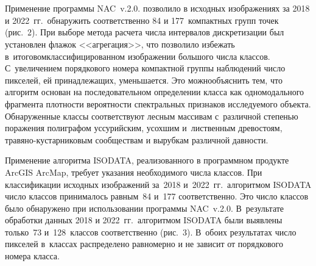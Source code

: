 \begin{multicols}{2}
\begin{figure*} %
 \vspace*{1pt}
\begin{center}
   \mbox{%
\epsfxsize=163mm 
}
\end{center}
\vspace*{-9pt}
 \vspace*{7pt}
\begin{center}
   \mbox{%
\epsfxsize=163mm 
}
\end{center}
\vspace*{-9pt}
\end{figure*}
  
  Применение программы NAC~v.2.0. позволило в исходных изображениях за 
2018 и 2022~гг.\ обнаружить соответственно 84 и 177~компактных групп точек 
(рис.~2). При выборе метода расчета чис\-ла интервалов 
дискретизации был установлен флажок <<агрегация>>, что позволило избежать 
в~итоговом\linebreak классифицированном изображении большого чис\-ла классов. 
С~увеличением порядкового номера компактной группы наблюдений чис\-ло 
пикселей, ей при\-над\-ле\-жа\-щих, уменьшается. Это можно\linebreak объяснить тем, что 
алгоритм основан на по\-сле\-до\-ва\-тель\-ном опре\-де\-ле\-нии класса как 
одномодального фрагмента плот\-ности ве\-ро\-ятн\-ости спект\-раль\-ных 
признаков исследуемого объекта. \mbox{Обнаруженные} классы соответствуют лес\-ным 
массивам с~различной сте\-пенью поражения полиграфом уссурийским, 
усохшим и~лиственным древостоям, тра\-вя\-но-кус\-тар\-ни\-ко\-вым 
сообществам и вырубкам различной дав\-ности.



  Применение алгоритма ISODATA, реализованного в программном продукте 
ArcGIS ArcMap, требует указания необходимого числа классов. При 
классификации исходных изображений за~2018 и~2022~гг.\ алгоритмом 
ISODATA число классов принималось равным~84 и~177 соответственно. Это 
число классов было обнаружено при использовании программы NAC~v.2.0. 
В~результате обработки данных 2018 и 2022~гг.\ алгоритмом ISODATA были
выявлены только~73 и~128~классов соответственно (рис.~3). В~обоих результатах число пикселей в~классах распределено 
равномерно и не зависит от порядкового номера класса.
  




\end{multicols}
